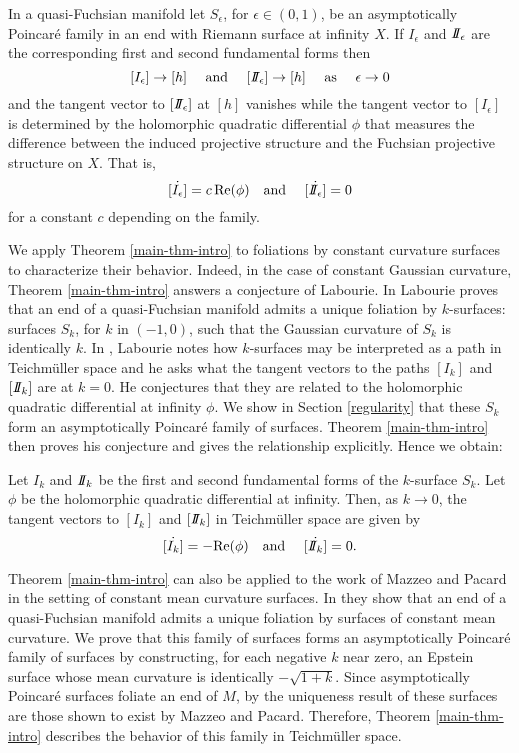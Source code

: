 \begin{bigthm}
\label{main-thm-intro}
In a quasi-Fuchsian manifold let $S_\epsilon$, for $\epsilon \in (0,1)$, be an asymptotically Poincar\'e family in an end with Riemann surface at infinity $X$.
If $I_\epsilon$ and $I\!\!I_\epsilon$ are the corresponding first and second fundamental forms then 
\[
[I_\epsilon] \to [h] 
\quad \text{ and } \quad 
[I\!\!I_\epsilon] \to [h]
\quad \text{ as } \quad \epsilon \to 0
\] 
and the tangent vector to $[I\!\!I_\epsilon]$ at $[h]$ vanishes while the tangent vector to $[I_\epsilon]$ is determined by the holomorphic quadratic differential $\phi$ that measures the difference between the induced projective structure and the Fuchsian projective structure on $X$.
That is,
\[
\dot{[I_\epsilon]} = c \, \mathrm{Re}(\phi) \quad \text{and } \quad \dot{[I\!\!I_\epsilon]} = 0
\]
for a constant $c$ depending on the family.
\end{bigthm} 
We apply Theorem \ref{main-thm-intro} to foliations by constant curvature surfaces to characterize their behavior. 
Indeed, in the case of constant Gaussian curvature, Theorem \ref{main-thm-intro} answers a conjecture of Labourie.
In \cite{labourie1991} Labourie proves that an end of a quasi-Fuchsian manifold admits a unique foliation by $k$-surfaces: surfaces $S_k$, for $k$ in $(-1,0)$, such that the Gaussian curvature of $S_k$ is identically $k$. 
In \cite{labourie1992}, Labourie notes how $k$-surfaces may be interpreted as a path in Teichm\"uller space and he asks what the tangent vectors to the paths $[I_k]$ and $[I\!\!I_k]$ are at $k=0$. 
He conjectures that they are related to the holomorphic quadratic differential at infinity $\phi$.
We show in Section \ref{regularity} that these $S_k$ form an asymptotically Poincar\'e family of surfaces.
Theorem \ref{main-thm-intro} then proves his conjecture and gives the relationship explicitly.
Hence we obtain:

\begin{bigthm} \label{k-surfaces-intro}
Let $I_k$ and $I\!\!I_k$ be the first and second fundamental forms of the $k$-surface $S_k$. 
Let $\phi$ be the holomorphic quadratic differential at infinity. 
Then, as $k \to 0$, the tangent vectors to $[I_k]$ and $[I\!\!I_k]$ in Teichm\"uller space are given by 
\[
  \dot{[I_k]}= - \mathrm{Re}(\phi) \quad \text{and } \quad \dot{[I\!\!I_k]} = 0.
\]
\end{bigthm}

Theorem \ref{main-thm-intro} can also be applied to the work of Mazzeo and Pacard in the setting of constant mean curvature surfaces.
In \cite{mazzeo-pacard2011} they show that an end of a quasi-Fuchsian manifold admits a unique foliation by surfaces of constant mean curvature. 
We prove that this family of surfaces forms an asymptotically Poincar\'e family of surfaces by constructing, for each negative $k$ near zero, an Epstein surface whose mean curvature is identically $-\sqrt{1+k}$.
Since asymptotically Poincar\'e surfaces foliate an end of $M$, by the uniqueness result of \cite{mazzeo-pacard2011} these surfaces are those shown to exist by Mazzeo and Pacard.
Therefore, Theorem \ref{main-thm-intro} describes the behavior of this family in Teichm\"uller space.  

